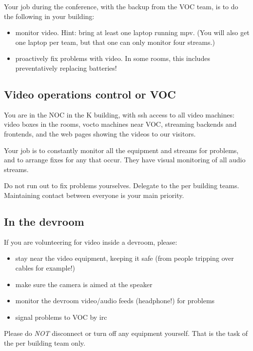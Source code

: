 \documentclass{article}
\begin{document}
Your job during the conference, with the backup from the VOC team, is to do the following in your building:
\begin{itemize}
	\item monitor video. Hint: bring at least one laptop running mpv. (You will also get one laptop per team, but that one can only monitor four streams.)
  \item proactively fix problems with video. In some rooms, this includes preventatively replacing batteries!
\end{itemize}


\subsection{Video operations control or VOC}
You are in the NOC in the K building, with ssh access to all video machines: video boxes in the rooms, vocto machines near VOC, streaming backends and frontends, and the web pages showing the videos to our visitors.

Your job is to constantly monitor all the equipment and streams for problems, and to arrange fixes for any that occur. They have visual monitoring of all audio streams.

Do not run out to fix problems yourselves. Delegate to the per building teams. Maintaining contact between everyone is your main priority.

\subsection{In the devroom}
If you are volunteering for video inside a devroom, please:
\begin{itemize}
  \item stay near the video equipment, keeping it safe (from people tripping over cables for example!)
  \item make sure the camera is aimed at the speaker
  \item monitor the devroom video/audio feeds (headphone!) for problems
  \item signal problems to VOC by irc
\end{itemize}

Please do \emph{NOT} disconnect or turn off any equipment yourself. That is the task of the per building team only.
\end{document}

